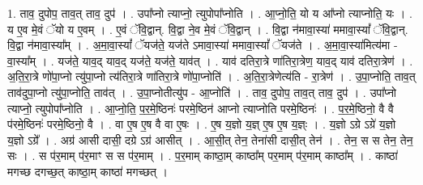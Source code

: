 \documentclass[17pt]{extarticle}
\begin{document}
1. ताव॒ दुपोप॒ ताव॒त् ताव॒ दुप॑ । . उपा᳚प्नो त्याप्नो॒ त्युपोपा᳚प्नोति । . आ॒प्नो॒ति॒ यो य आ᳚प्नो त्याप्नोति॒ यः । . य ए॒व मे॒वं ॅयो य ए॒वम् । . ए॒वं ॅवि॒द्वान्. वि॒द्वा ने॒व मे॒वं ॅवि॒द्वान् । . वि॒द्वा न॑मावा॒स्या॑ ममावा॒स्यां᳚ ॅवि॒द्वान्. वि॒द्वा न॑मावा॒स्या᳚म् । . अ॒मा॒वा॒स्यां᳚ ॅयज॑ते॒ यज॑ते ऽमावा॒स्या॑ ममावा॒स्यां᳚ ॅयज॑ते । . अ॒मा॒वा॒स्या॑मित्य॑मा - वा॒स्या᳚म् । . यज॑ते॒ याव॒द् याव॒द् यज॑ते॒ यज॑ते॒ याव॑त् । . याव॑ दतिरा॒त्रे णा॑तिरा॒त्रेण॒ याव॒द् याव॑ दतिरा॒त्रेण॑ । . अ॒ति॒रा॒त्रे णो॑पा॒प्नो त्यु॑पा॒प्नो त्य॑तिरा॒त्रे णा॑तिरा॒त्रे णो॑पा॒प्नोति॑ । . अ॒ति॒रा॒त्रेणेत्य॑ति - रा॒त्रेण॑ । . उ॒पा॒प्नोति॒ ताव॒त् ताव॑दुपा॒प्नो त्यु॑पा॒प्नोति॒ ताव॑त् । . उ॒पा॒प्नोतीत्यु॑प - आ॒प्नोति॑ । . ताव॒ दुपोप॒ ताव॒त् ताव॒ दुप॑ । . उपा᳚प्नो त्याप्नो॒ त्युपोपा᳚प्नोति । . आ॒प्नो॒ति॒ प॒र॒मे॒ष्ठिनः॑ परमे॒ष्ठिन॑ आप्नो त्याप्नोति परमे॒ष्ठिनः॑ । . प॒र॒मे॒ष्ठिनो॒ वै वै प॑रमे॒ष्ठिनः॑ परमे॒ष्ठिनो॒ वै । . वा ए॒ष ए॒ष वै वा ए॒षः । . ए॒ष य॒ज्ञो य॒ज्ञ् ए॒ष ए॒ष य॒ज्ञ्ः । . य॒ज्ञो ऽग्रे ऽग्रे॑ य॒ज्ञो य॒ज्ञो ऽग्रे᳚ । . अग्र॑ आसी दासी॒ दग्रे ऽग्र॑ आसीत् । . आ॒सी॒त् तेन॒ तेना॑सी दासी॒त् तेन॑ । . तेन॒ स स तेन॒ तेन॒ सः । . स प॑र॒माम् प॑र॒माꣳ स स प॑र॒माम् । . प॒र॒माम् काष्ठा॒म् काष्ठा᳚म् पर॒माम् प॑र॒माम् काष्ठा᳚म् । . काष्ठा॑ मगच्छ दगच्छ॒त् काष्ठा॒म् काष्ठा॑ मगच्छत् । \newline
\end{document}
